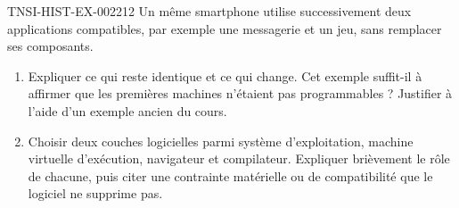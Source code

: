 \begin{exercice}{TNSI-HIST-EX-002}{2}{12}
Un même smartphone utilise successivement deux applications compatibles,
par exemple une messagerie et un jeu, sans remplacer ses composants.
\begin{enumerate}
  \item Expliquer ce qui reste identique et ce qui change. Cet exemple
    suffit-il à affirmer que les premières machines n'étaient pas
    programmables ? Justifier à l'aide d'un exemple ancien du cours.
  \item Choisir deux couches logicielles parmi système d'exploitation,
    machine virtuelle d'exécution, navigateur et compilateur. Expliquer
    brièvement le rôle de chacune, puis citer une contrainte matérielle
    ou de compatibilité que le logiciel ne supprime pas.
\end{enumerate}
\end{exercice}
